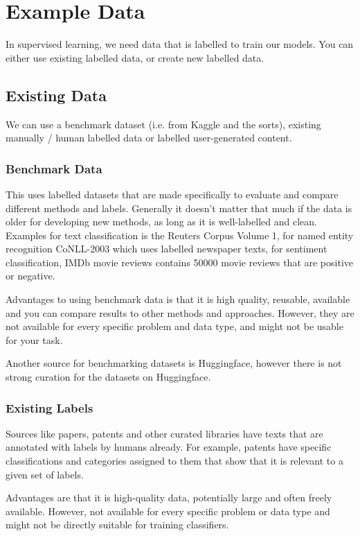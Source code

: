 \section{Example Data}

In supervised learning, we need data that is labelled to train
our models. You can either use existing labelled data, or create
new labelled data.

\subsection{Existing Data}

We can use a benchmark dataset (i.e. from Kaggle and the sorts),
existing manually / human labelled data or labelled user-generated
content.

\subsubsection{Benchmark Data}

This uses labelled datasets that are made specifically to evaluate
and compare different methods and labels. Generally it doesn't matter
that much if the data is older for developing new methods, as long as it
is well-labelled and clean. Examples for text classification is the Reuters
Corpus Volume 1, for named entity recognition CoNLL-2003 which uses labelled
newspaper texts, for sentiment classification, IMDb movie reviews contains
50000 movie reviews that are positive or negative.

Advantages to using benchmark data is that it is high quality,
reusable, available
and you can compare results to other methods and approaches. However,
they are not
available for every specific problem and data type, and might not be
usable for your
task.

Another source for benchmarking datasets is Huggingface, however
there is not strong
curation for the datasets on Huggingface.

\subsubsection{Existing Labels}

Sources like papers, patents and other curated libraries have texts that are
annotated with labels by humans already. For example, patents have specific
classifications and categories assigned to them that show that it is relevant
to a given set of labels.

Advantages are that it is high-quality data, potentially large and
often freely available.
However, not available for every specific problem or data type and
might not be directly
suitable for training classifiers.


